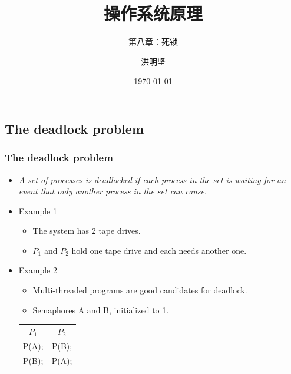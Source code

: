 \documentclass[CJKutf8,xcolor=pdftex,dvipsnames,table]{beamer}
\begin{document}
\begin{CJK*}{UTF8}{song}

  \title{ 操作系统原理}
  \subtitle{ 第八章：死锁}
	\author{ 洪明坚}
  \date{\today}


  \frame{\titlepage}


\section{The deadlock problem}

  \begin{frame}
  \frametitle{The deadlock problem} \pause
  \begin{itemize}
  \item{\emph{A set of processes is deadlocked if each process in the set is waiting for an event that only another process in the set can cause}.} \pause
  \item{Example 1} \pause
    \begin{itemize}
    \item{The system has 2 tape drives.} \pause
    \item{$P_1$ and $P_2$ hold one tape drive and each needs another one.} \pause
    \end{itemize}
  \item{Example 2} \pause
    \begin{itemize}
    \item{Multi-threaded programs are good candidates for deadlock.} \pause
    \item{Semaphores A and B, initialized to 1.} \pause
    \end{itemize}
    \centering
    \begin{tabular}{cc}
      $P_1$  \hspace{2cm}   &  \hspace{2cm}   $P_2$\\
      P(A);  \hspace{2cm}   &  \hspace{2cm}   P(B);\\
      P(B);  \hspace{2cm}   &  \hspace{2cm}   P(A);\\
    \end{tabular}
  \end{itemize}
  \end{frame}
  

\end{CJK*}
\end{document}
